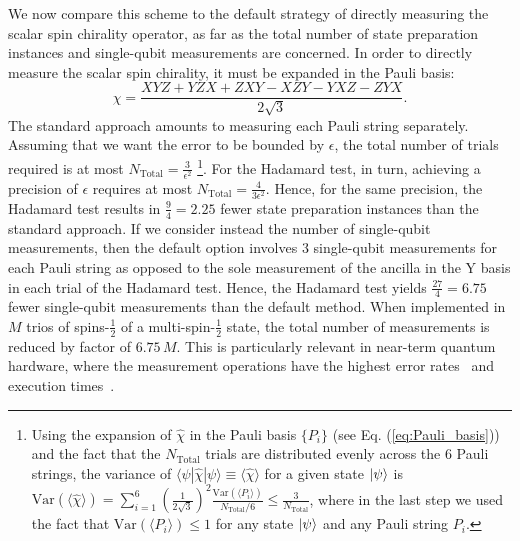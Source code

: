 \documentclass[aps,prl,twocolumn]{revtex4}
\newcommand{\efg}[1]{{\color{orange}[EFG]#1}}
\begin{document}
We now compare this scheme to the default strategy of directly measuring the scalar spin chirality operator, as far as the total number of state preparation instances and single-qubit measurements are concerned. In order to directly measure the scalar spin chirality, it must be expanded in the Pauli basis:
\begin{equation}
    \hat{\chi} = \frac{XYZ + YZX + ZXY - XZY - YXZ - ZYX}{2 \sqrt{3}}.
    \label{eq:Pauli_basis}
\end{equation}
The standard approach amounts to measuring each Pauli string separately. Assuming that we want the error to be bounded by $\epsilon$, the total number of trials required is at most $N_{\textrm{Total}} = \frac{3}{\epsilon^2}$ \footnote{Using the expansion of $\hat{\chi}$ in the Pauli basis $\{ P_i \}$ (see Eq. (\ref{eq:Pauli_basis})) and the fact that the $N_{\textrm{Total}}$ trials are distributed evenly across the $6$ Pauli strings, the variance of $\langle \psi | \hat{\chi} | \psi \rangle \equiv \langle \hat{\chi} \rangle$ for a given state $\ket{\psi}$ is $\textrm{Var}(\langle \hat{\chi} \rangle) = \sum_{i = 1}^{6} \left( \frac{1}{2 \sqrt{3}} \right)^2 \frac{\textrm{Var}(\langle P_i \rangle)}{N_{\textrm{Total}}/6} \leq \frac{3}{N_{\textrm{Total}}}$, where in the last step we used the fact that $\textrm{Var}(\langle P_i \rangle) \leq 1$ for any state $\ket{\psi}$ and any Pauli string $P_i$.}. For the Hadamard test, in turn, achieving a precision of $\epsilon$ requires at most $N_{\textrm{Total}} = \frac{4}{3 \epsilon^2}$. Hence, for the same precision, the Hadamard test results in $\frac{9}{4} = 2.25$ fewer state preparation instances than the standard approach. If we consider instead the number of single-qubit measurements, then the default option involves $3$ single-qubit measurements for each Pauli string as opposed to the sole measurement of the ancilla in the Y basis in each trial of the Hadamard test. Hence, the Hadamard test yields $\frac{27}{4} = 6.75$ fewer single-qubit measurements than the default method. When implemented in $M$ trios of spins-$\frac{1}{2}$ of a multi-spin-$\frac{1}{2}$ state, the total number of measurements is reduced by factor of $6.75 \, M$. This is particularly relevant in near-term quantum hardware, where the measurement operations have the highest error rates~\cite{Funcke22} and execution times~\cite{Cheng23}. 
%
\end{document}
